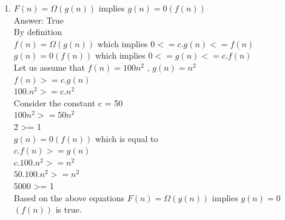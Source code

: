 \documentclass[11pt]{article}
\begin{document}
\begin{enumerate}

\itemsep 0.35in
 
\item

$F(n) = \Omega (g(n))$ implies $g(n) = $0$ (f(n))$ \\

Answer: True \\

By definition\\
$f(n) = \Omega (g(n))$ which implies  $0 <= c.g(n) <= f(n)$ \\
$g(n) = $0$ (f(n))$ which implies $0 <=  g(n) <= c.f(n)$ \\
Let us assume that $f(n) = 100n^2$ , $g(n) = n^2$ \\
$f(n) >=  c.g(n)$ \\
$100.n^2 >=  c.n^2$\\
Consider the constant c = 50 \\
$100n^2 >= 50n^2$ \\
2 >= 1 \\
$g(n) = $0$ (f(n))$ which is equal to \\ 
$c.f(n) >= g(n)$ \\ 
$c.100.n^2 >=  n^2$\\
$50.100.n^2 >= n^2$ \\
5000 >= 1 \\

Based on the above equations $F(n) = \Omega (g(n))$ implies $g(n) = $0$ (f(n))$ is true.
   
\end{enumerate}
\end{document}
